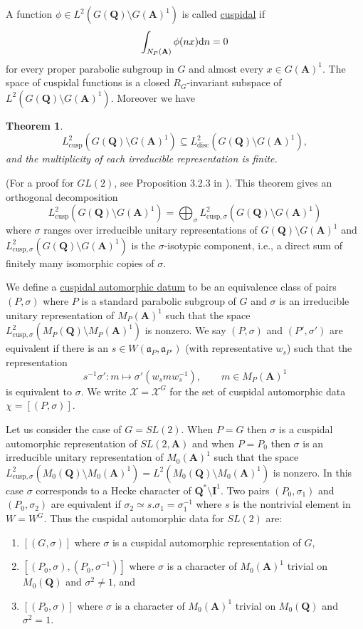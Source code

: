 \documentclass[11pt]{amsart}
\def\A{\mathbf A}
\def\I{\mathbf I}
\def\Q{\mathbf Q}
\def\XXX{\mathcal X}
\def\aaa{\mathfrak a}
\def\d{\text d}
\def\bs{\setminus}
\def\cusp{\text{cusp}}
\def\disc{\text{disc}}
\def\Ltwo{L^2}
\newtheorem{theorem}{Theorem}[section]
\theoremstyle{remark}
\begin{document}
A function $\phi \in \Ltwo(G(\Q) \bs G(\A)^1)$ is called \underline{cuspidal} if 
\[ \int_{N_P(\A)} \phi(nx) \d n = 0 \]
for every proper parabolic subgroup in $G$ and almost every $x \in G(\A)^1$. The space of cuspidal functions is a closed $R_G$-invariant subspace of $\Ltwo(G(\Q)\bs G(\A)^1)$. Moreover we have
\begin{theorem} \cite{MR1071179}
	\[ \Ltwo_\cusp(G(\Q)\bs G(\A)^1) \subseteq \Ltwo_\disc(G(\Q)\bs G(\A)^1), \]
	and the multiplicity of each irreducible representation is finite. 
\end{theorem}
(For a proof for $GL(2)$, see Proposition 3.2.3 in \cite{MR1431508}). This theorem gives an orthogonal decomposition
\[ \Ltwo_\cusp(G(\Q)\bs G(\A)^1) = \bigoplus_\sigma \Ltwo_{\cusp, \sigma} (G(\Q)\bs G(\A)^1) \]
where $\sigma$ ranges over irreducible unitary representations of $G(\Q)\bs G(\A)^1$ and $\Ltwo_{\cusp, \sigma} (G(\Q)\bs G(\A)^1)$ is the $\sigma$-isotypic component, i.e., a direct sum of finitely many isomorphic copies of $\sigma$. 

We define a \underline{cuspidal automorphic datum} to be an equivalence class of pairs $(P, \sigma)$ where $P$ is a standard parabolic subgroup of $G$ and $\sigma$ is an irreducible unitary representation of $M_P(\A)^1$ such that the space $\Ltwo_{\cusp, \sigma} (M_P(\Q)\bs M_P(\A)^1)$ is nonzero. We say $(P, \sigma)$ and $(P', \sigma')$ are equivalent if there is an $s \in W(\aaa_P, \aaa_{P'})$ (with representative $w_s$) such that the representation 
\[ s^{-1}\sigma' : m \mapsto \sigma'(w_s m w_s^{-1}), \qquad m \in M_P(\A)^1 \]
is equivalent to $\sigma$. We write $\XXX = \XXX^G$ for the set of cuspidal automorphic data $\chi = [(P, \sigma)]$. 

Let us consider the case of $G = SL(2)$. When $P=G$ then $\sigma$ is a cuspidal automorphic representation of $SL(2,\A)$ and when $P=P_0$ then $\sigma$ is an irreducible unitary representation of $M_0(\A)^1$ such that the space $\Ltwo_{\text{cusp}, \sigma}(M_0(\Q)\bs M_0(\A)^1) = \Ltwo(M_0(\Q)\bs M_0(\A)^1)$ is nonzero. In this case $\sigma$ corresponds to a Hecke character of $\Q^*\bs \I^1$. Two pairs $(P_0, \sigma_1)$ and $(P_0, \sigma_2)$ are equivalent if $\sigma_2 \simeq s.\sigma_1 = \sigma_1^{-1}$ where $s$ is the nontrivial element in $W = W^G$. Thus the cuspidal automorphic data for $SL(2)$ are:
\begin{enumerate}
\item $[(G, \sigma)]$ where $\sigma$ is a cuspidal automorphic representation of $G$,
\item $[(P_0, \sigma), (P_0, \sigma^{-1})]$ where $\sigma$ is a character of $M_0(\A)^1$ trivial on $M_0(\Q)$ and $\sigma^2 \neq 1$, and
\item $[(P_0, \sigma)]$ where $\sigma$ is a character of $M_0(\A)^1$ trivial on $M_0(\Q)$ and $\sigma^2 = 1$.
\end{enumerate}
\end{document}
